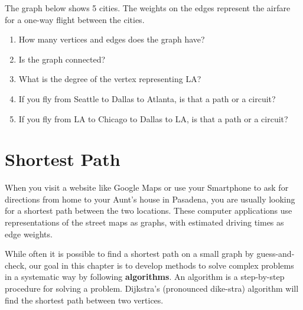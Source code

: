 \begin{exercise}{}{}
The graph below shows 5 cities.  The weights on the edges represent the airfare for a one-way flight between the cities.
 \begin{enumerate}[label=\alph*.]
 \item How many vertices and edges does the graph have?
 \item Is the graph connected?
 \item What is the degree of the vertex representing LA?
 \item If you fly from Seattle to Dallas to Atlanta, is that a path or a circuit?
 \item If you fly from LA to Chicago to Dallas to LA, is that a path or a circuit?
 \end{enumerate}
 
 \end{exercise}


\section{Shortest Path}
When you visit a website like Google Maps or use your Smartphone to ask for directions from home to your Aunt's house in Pasadena, you are usually looking for a shortest path between the two locations.  These computer applications use representations of the street maps as graphs, with estimated driving times as edge weights.

While often it is possible to find a shortest path on a small graph by guess-and-check, our goal in this chapter is to develop methods to solve complex problems in a systematic way by following \textbf{algorithms}.  An algorithm is a step-by-step procedure for solving a problem.  Dijkstra's (pronounced dike-stra) algorithm will find the shortest path between two vertices.


